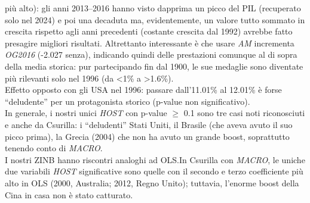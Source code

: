 più alto): gli anni 2013--2016 hanno visto dapprima un picco del PIL (recuperato
solo nel 2024) e poi una decaduta ma, evidentemente, un valore tutto sommato in
crescita rispetto agli anni precedenti (costante crescita dal 1992) avrebbe
fatto presagire migliori risultati. Altrettanto interessante è che usare
\textit{AM} incrementa \textit{OG2016} (-2.027 senza), indicando quindi delle
prestazioni comunque al di sopra della media storica: pur partecipando fin dal
1900, le sue medaglie sono diventate più rilevanti solo nel 1996 (da <1\% a
>1.6\%).\\
Effetto opposto con gli USA nel 1996: passare dall'11.01\% al 12.01\% è forse
``deludente'' per un protagonista storico (p-value non significativo).\\
In generale, i nostri unici \textit{HOST} con p-value $\ge$ 0.1 sono tre casi
noti riconosciuti e anche da Csurilla: i ``deludenti'' Stati Uniti, il Brasile
(che aveva avuto il suo picco prima), la Grecia (2004) che non ha avuto un
grande boost, soprattutto tenendo conto di \textit{MACRO}.  
\\
I nostri ZINB hanno riscontri analoghi ad OLS.\@ In Csurilla con \textit{MACRO},
le uniche due variabili \textit{HOST} significative sono quelle con il secondo e
terzo coefficiente più alto in OLS (2000, Australia; 2012, Regno Unito);
tuttavia, l'enorme boost della Cina in casa non è stato catturato.\\
\\

